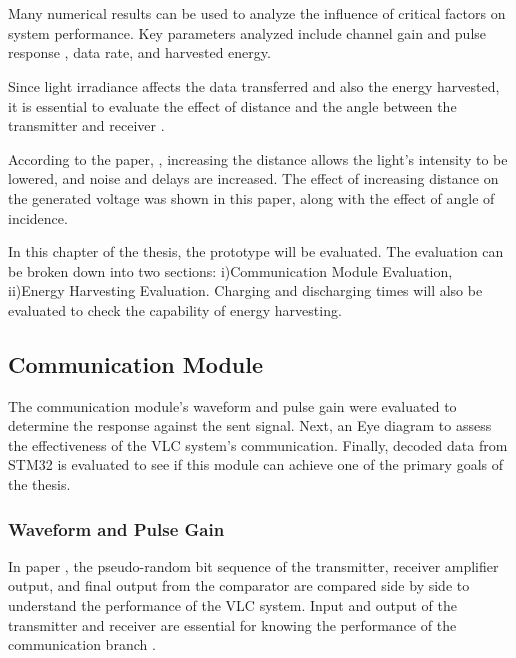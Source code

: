 \chapter{}


Many numerical results can be used to analyze the influence of critical factors on system performance. Key parameters analyzed include channel gain and pulse response \cite{fan2017circuit}, data rate\cite{liu2016visible}, and harvested energy\cite{diamantoulakis2018simultaneous}.

Since light irradiance affects the data transferred and also the energy harvested, it is essential to evaluate the effect of distance and the angle between the transmitter and receiver \cite{fong2012integrated}. 

According to the paper, \cite{mahmoud2022design}, increasing the distance allows the light's intensity to be lowered, and noise and delays are increased. The effect of increasing distance on the generated voltage was shown in this paper, along with the effect of angle of incidence.

In this chapter of the thesis, the prototype will be evaluated. The evaluation can be broken down into two sections: i)Communication Module Evaluation, ii)Energy Harvesting Evaluation. Charging and discharging times will also be evaluated to check the capability of energy harvesting. 

\section{Communication Module}

The communication module's waveform and pulse gain were evaluated to determine the response against the sent signal. Next, an Eye diagram to assess the effectiveness of the \ac{VLC} system's communication. Finally, decoded data from STM32 is evaluated to see if this module can achieve one of the primary goals of the thesis.


\subsection{Waveform and Pulse Gain}

In paper \cite{fan2017circuit}, the pseudo-random bit sequence of the transmitter, receiver amplifier output, and final output from the comparator are compared side by side to understand the performance of the \ac{VLC} system. Input and output of the transmitter and receiver are essential for knowing the performance of the communication branch \cite{tudose2011energy}.

